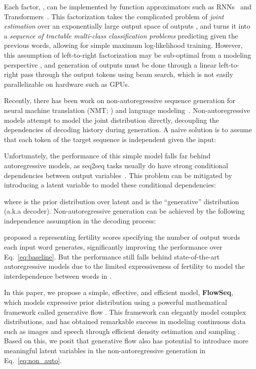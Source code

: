 \documentclass[11pt,a4paper]{article}
\begin{document}
Each factor, , can be implemented by function approximators such as RNNs~\citep{bahdanau2014neural} and Transformers~\citep{vaswani2017attention}.
This factorization takes the complicated problem of \emph{joint estimation} over an exponentially large output space of outputs , and turns it into a \emph{sequence of tractable multi-class classification problems} predicting  given the previous words, allowing for simple maximum log-likelihood training.
However, this assumption of left-to-right factorization may be sub-optimal from a modeling perspective \cite{gu2019insertion,stern2019insertion}, and generation of outputs must be done through a linear left-to-right pass through the output tokens using beam search, which is not easily parallelizable on hardware such as GPUs.

Recently, there has been work on non-autoregressive sequence generation for neural machine translation (NMT; \citet{gu2018non,lee2018deterministic,constant2019}) and language modeling~\citep{ziegler2019latent}.
Non-autoregressive models attempt to model the joint distribution  directly, decoupling the dependencies of decoding history during generation.
A na\"ive solution is to assume that each token of the target sequence is independent given the input:

Unfortunately, the performance of this simple model falls far behind autoregressive models, as seq2seq tasks usually do have strong conditional dependencies between output variables~\citep{gu2018non}. This problem can be mitigated by introducing a latent variable  to model these conditional dependencies:

where  is the prior distribution over latent  and  is the ``generative'' distribution (a.k.a decoder).
Non-autoregressive generation can be achieved by the following independence assumption in the decoding process:

\citet{gu2018non} proposed a  representing fertility scores specifying the number of output words each input word generates, significantly improving the performance over Eq.~\eqref{eq:baseline}. 
But the performance still falls behind state-of-the-art autoregressive models due to the limited expressiveness of fertility to model the interdependence between words in .

In this paper, we propose a simple, effective, and efficient model, \textbf{FlowSeq}, which models expressive prior distribution  using a powerful mathematical framework called generative flow \cite{rezende2015variational}.
This framework can elegantly model complex distributions, and has obtained remarkable success in modeling continuous data such as images and speech through efficient density estimation and sampling \cite{kingma2018glow,prenger2019waveglow,ma2019macow}.
Based on this, we posit that generative flow also has potential to introduce more meaningful latent variables  in the non-autoregressive generation in Eq.~\eqref{eq:non_auto}.
\end{document}
